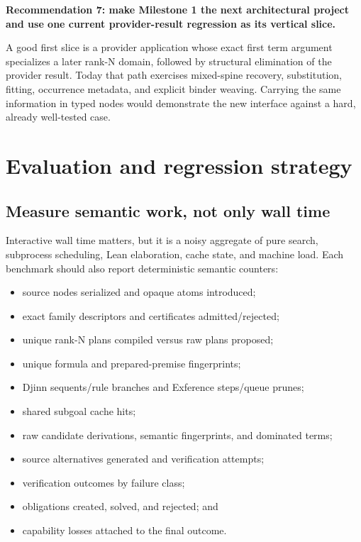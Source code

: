 \documentclass[11pt]{article}
\newcommand{\Djinn}{Djinn}
\newcommand{\Exference}{Exference}
\newenvironment{recommendation}[1]
{\par\medskip\noindent\colorbox{GoodBg}{\parbox{\dimexpr\linewidth-2\fboxsep\relax}{\sffamily\bfseries #1}}\par\smallskip}
{\par\medskip}
\begin{document}
\begin{recommendation}{Recommendation 7: make Milestone 1 the next architectural project and use one current provider-result regression as its vertical slice.}
A good first slice is a provider application whose exact first term argument
specializes a later rank-N domain, followed by structural elimination of the
provider result.  Today that path exercises mixed-spine recovery, substitution,
fitting, occurrence metadata, and explicit binder weaving.  Carrying the same
information in typed nodes would demonstrate the new interface against a
hard, already well-tested case.
\end{recommendation}

\section{Evaluation and regression strategy}
\label{sec:evaluation}

\subsection{Measure semantic work, not only wall time}

Interactive wall time matters, but it is a noisy aggregate of pure search,
subprocess scheduling, Lean elaboration, cache state, and machine load.  Each
benchmark should also report deterministic semantic counters:

\begin{itemize}
  \item source nodes serialized and opaque atoms introduced;
  \item exact family descriptors and certificates admitted/rejected;
  \item unique rank-N plans compiled versus raw plans proposed;
  \item unique formula and prepared-premise fingerprints;
  \item \Djinn{} sequents/rule branches and \Exference{} steps/queue prunes;
  \item shared subgoal cache hits;
  \item raw candidate derivations, semantic fingerprints, and dominated terms;
  \item source alternatives generated and verification attempts;
  \item verification outcomes by failure class;
  \item obligations created, solved, and rejected; and
  \item capability losses attached to the final outcome.
\end{itemize}
\end{document}
